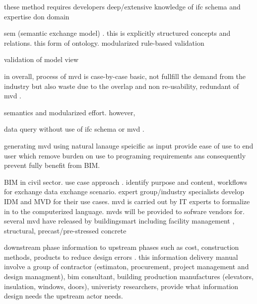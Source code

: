\documentclass[Journal, InsideFigs, DoubleSpace]{ascelike} %
\begin{document}
these method requires developers deep/extensive knowledge of ifc schema and expertise don domain 

sem (semantic exchange model) \cite{venugopal12a}. this is explicitly structured concepts and relations. this form of ontology.  modularized rule-based validation \cite{lee16}

validation of model view 

 in overall, process of mvd is case-by-case basic, not fullfill the demand from the industry but also waste due to the overlap and non re-usability, redundant of mvd \cite{zhang13}. 

semantics and modularized effort. however, 


data query without use of ifc schema or mvd \cite{won13}.

generating mvd using natural lanauge speicific as input provide ease of use to end user \cite{jiang15} which remove burden on use to programing requirements ans consequently prevent fully benefit from BIM. 

BIM in civil sector. use case approach \cite{eastman09,see12}. identify purpose and content, workflows for exchange data exchange scenario. expert group/industry specialists develop IDM and MVD for their use cases. mvd is carried out by IT experts to formalize in to the computerized language. mvds will be provided to sofware vendors for. several mvd have released by buildingsmart including facility management \cite{eastman12}, structural, precast/pre-stressed concrete \cite{venugopal12b}

downstream phase information to upstream phases such as cost, construction methods, products to reduce design errors \cite{berard12}. this information delivery manual involve a group of contractor (estimaton, procurement, project management and design managment), bim consultant, building production manufactures (elevators, insulation, windows, doors), univeristy researchers,  provide what information design needs the upstream actor needs. 
\end{document}
